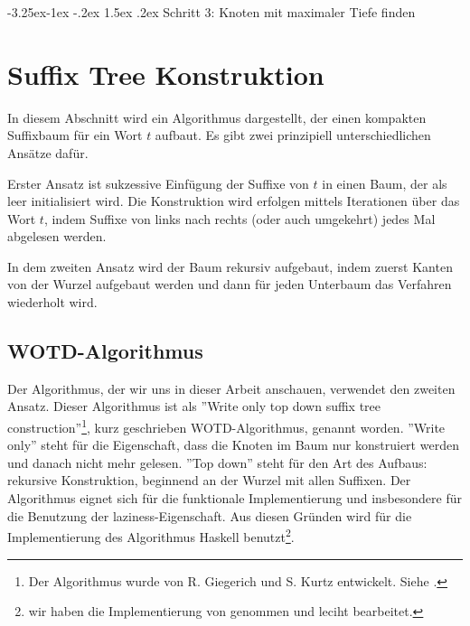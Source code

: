 \documentclass[12pt]{report}
\makeatletter
\renewcommand\paragraph{\@startsection{paragraph}{4}{\z@}%
    {-3.25ex\@plus -1ex \@minus -.2ex}%
    {1.5ex \@plus .2ex}%
    {\normalfont\normalsize\bfseries}}
\makeatother
\begin{document}
\paragraph{Schritt 3: Knoten mit maximaler Tiefe finden}

\section{Suffix Tree Konstruktion}
\label{sec:SuffixTreeKonstruktion}

In diesem Abschnitt wird ein Algorithmus dargestellt, der einen kompakten Suffixbaum für ein Wort $t$ aufbaut. Es gibt zwei prinzipiell unterschiedlichen Ansätze dafür.

Erster Ansatz ist sukzessive Einfügung der Suffixe von $t$ in einen Baum, der als leer initialisiert wird. Die Konstruktion wird erfolgen mittels Iterationen über das Wort $t$, indem Suffixe von links nach rechts (oder auch umgekehrt) jedes Mal abgelesen werden.

In dem zweiten Ansatz wird der Baum rekursiv aufgebaut, indem zuerst Kanten von der Wurzel aufgebaut werden und dann für jeden Unterbaum das Verfahren wiederholt wird.

\subsection{WOTD-Algorithmus}
\label{sec:WOTDAlgorithmus}

Der Algorithmus, der wir uns in dieser Arbeit anschauen, verwendet den zweiten Ansatz. Dieser Algorithmus ist als ''Write only top down suffix tree construction''\footnote{Der Algorithmus wurde von R. Giegerich und S. Kurtz entwickelt. Siehe \cite{Giegerich1995}.}, kurz geschrieben WOTD-Algorithmus, genannt worden. ''Write only'' steht für die Eigenschaft, dass die Knoten im Baum nur konstruiert werden und danach nicht mehr gelesen. ''Top down'' steht für den Art des Aufbaus: rekursive Konstruktion, beginnend an der Wurzel mit allen Suffixen. Der Algorithmus eignet sich für die funktionale Implementierung und insbesondere für die Benutzung der laziness-Eigenschaft. Aus diesen Gründen wird für die Implementierung des Algorithmus Haskell benutzt\footnote{wir haben die Implementierung von \cite{Giegerich1995} genommen und leciht bearbeitet.}.
\end{document}
